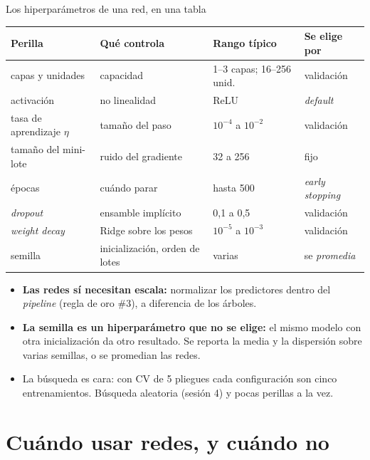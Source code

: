 \documentclass{beamer}
\newcommand{\1}{\mathbb{I}}
\begin{document}
\begin{frame}{Los hiperparámetros de una red, en una tabla}
\small
\begin{center}
\scriptsize
\setlength{\tabcolsep}{2pt}
\renewcommand{\arraystretch}{1.1}
\begin{tabular}{lp{3.0cm}ll}
\hline
Perilla & Qué controla & Rango típico & Se elige por \\
\hline
capas y unidades & capacidad & 1--3 capas; 16--256 unid. & validación \\
activación & no linealidad & ReLU & \emph{default} \\
tasa de aprendizaje $\eta$ & tamaño del paso & $10^{-4}$ a $10^{-2}$ & validación \\
tamaño del mini-lote & ruido del gradiente & 32 a 256 & fijo \\
épocas & cuándo parar & hasta 500 & \emph{early stopping} \\
\emph{dropout} & ensamble implícito & 0,1 a 0,5 & validación \\
\emph{weight decay} & Ridge sobre los pesos & $10^{-5}$ a $10^{-3}$ & validación \\
semilla & inicialización, orden de lotes & varias & se \emph{promedia} \\
\hline
\end{tabular}
\end{center}
\pause
\begin{itemize}\itemsep2pt
  \item \textbf{Las redes sí necesitan escala:} normalizar los predictores dentro del \emph{pipeline} (regla de oro \#3), a diferencia de los árboles.
  \item \textbf{La semilla es un hiperparámetro que no se elige:} el mismo modelo con otra inicialización da otro resultado. Se reporta la media y la dispersión sobre varias semillas, o se promedian las redes.
  \item La búsqueda es cara: con CV de 5 pliegues cada configuración son cinco entrenamientos. Búsqueda aleatoria (sesión 4) y pocas perillas a la vez.
\end{itemize}
\end{frame}


\section{Cuándo usar redes, y cuándo no}
\begin{frame}[noframenumbering]
\tableofcontents[currentsection]
\end{frame}
\end{document}
